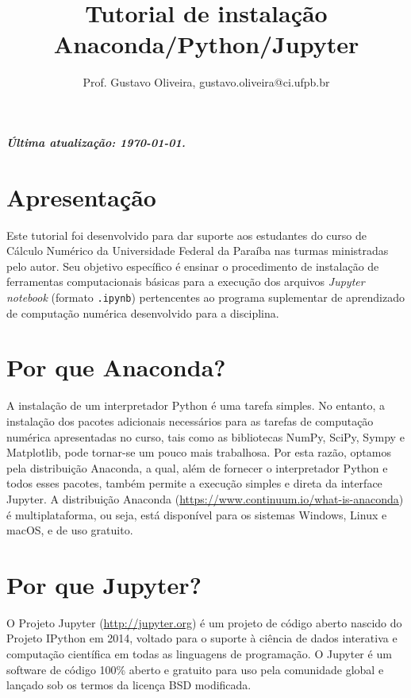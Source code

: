 \documentclass[a4paper,12pt]{article}
\title{Tutorial de instalação Anaconda/Python/Jupyter}
\author{Prof. Gustavo Oliveira, gustavo.oliveira@ci.ufpb.br}
\affil{Departamento de Computação Científica, CI/UFPB}
\date{}
\begin{document}
\maketitle



\subparagraph{\scriptsize{Última atualização: \today.}}

\section{Apresentação}

Este tutorial foi desenvolvido para dar suporte aos estudantes do curso
de Cálculo Numérico da Universidade Federal da Paraíba nas turmas ministradas pelo
autor. Seu objetivo específico é ensinar o procedimento de instalação de
ferramentas computacionais básicas para a execução dos arquivos
\emph{Jupyter notebook} (formato \texttt{.ipynb}) pertencentes ao
programa suplementar de aprendizado de computação numérica desenvolvido
para a disciplina.

\section*{Por que Anaconda?}

A instalação de um interpretador Python é uma tarefa simples. No
entanto, a instalação dos pacotes adicionais necessários para as tarefas
de computação numérica apresentadas no curso, tais como as bibliotecas
NumPy, SciPy, Sympy e Matplotlib, pode tornar-se um pouco mais
trabalhosa. Por esta razão, optamos pela distribuição Anaconda, a qual,
além de fornecer o interpretador Python e todos esses pacotes, também
permite a execução simples e direta da interface Jupyter. A distribuição
Anaconda (\url{https://www.continuum.io/what-is-anaconda}) é multiplataforma, 
ou seja, está disponível para os sistemas Windows, Linux e macOS, e de uso gratuito.

\section*{Por que Jupyter?}

O Projeto Jupyter (\url{http://jupyter.org}) é um projeto de código aberto nascido do Projeto
IPython em 2014, voltado para o suporte à ciência de dados interativa e
computação científica em todas as linguagens de programação. O Jupyter é
um software de código 100\% aberto e gratuito para uso pela comunidade
global e lançado sob os termos da licença BSD modificada.
\end{document}
